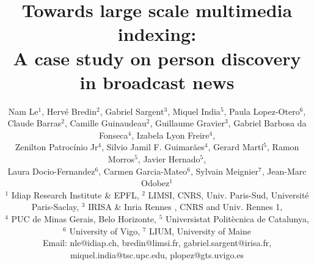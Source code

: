 \documentclass[10pt,conference,a4paper]{IEEEtran}
\begin{document}
%

\title{Towards large scale multimedia indexing: \\ A case study on person discovery in broadcast news}
%


\author{
Nam Le$^1$, Herv\'{e} Bredin$^2$, Gabriel Sargent$^3$, Miquel India$^5$, Paula Lopez-Otero$^6$, \\
Claude Barras$^2$, Camille Guinaudeau$^2$, Guillaume Gravier$^3$, Gabriel Barbosa da Fonseca$^4$, Izabela Lyon Freire$^4$, \\
Zenilton Patroc\'{i}nio Jr$^4$, Silvio Jamil F. Guimarães$^4$, Gerard Mart\'{i}$^5$, Ramon Morros$^5$, Javier Hernado$^5$, \\
Laura Docio-Fernandez$^6$, Carmen Garcia-Mateo$^6$, Sylvain Meignier$^7$, Jean-Marc Odobez$^1$\\

{\footnotesize $^1$ Idiap Research Institute \& EPFL},
{\footnotesize $^2$ LIMSI, CNRS, Univ. Paris-Sud, Université Paris-Saclay},
{\footnotesize $^3$ IRISA \& Inria Rennes , CNRS and Univ. Rennes 1}, \\
{\footnotesize $^4$ PUC de Minas Gerais, Belo Horizonte},
{\footnotesize $^5$ Universistat Politècnica de Catalunya},
{\footnotesize $^6$ University of Vigo},
{\footnotesize $^7$ LIUM, University of Maine} \\
{\footnotesize Email: nle@idiap.ch, bredin@limsi.fr, gabriel.sargent@irisa.fr, miquel.india@tsc.upc.edu, plopez@gts.uvigo.es}
}

\maketitle



\end{document}
